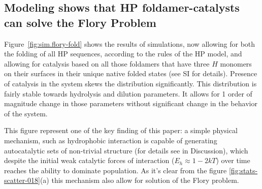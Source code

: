 \documentclass[journal=jacsat,manuscript=article,layout=twocolumn]{achemso}
\begin{document}
\subsection{Modeling shows that HP foldamer-catalysts can solve the Flory Problem}

Figure~\ref{fig:sim.flory-fold} shows the results of simulations, now allowing for both the 
folding of all HP sequences, according to the rules of the HP model, and allowing for catalysis 
based on all those foldamers that have three $H$ monomers on their surfaces in their unique native 
folded states (see SI for details). Presence of catalysis in the system skews the distribution 
significantly. This distribution is fairly stable towards hydrolysis and dilution
parameters. It allows for 1 order of magnitude change in those parameters without significant 
change in the behavior of the system.

This figure represent one of the key finding of this paper: a simple physical mechanism, such as 
hydrophobic interaction is capable of generating autocatalytic sets of non-trivial structure (for 
details see in Discussion), which despite the initial weak catalytic forces of 
interaction ($E_h\approx 1-2kT$) over time reaches the ability to dominate population. As it's 
clear from the figure \ref{fig:stats-scatter-018}(a) this mechanism also allow for solution of the 
Flory 
problem.
\end{document}
